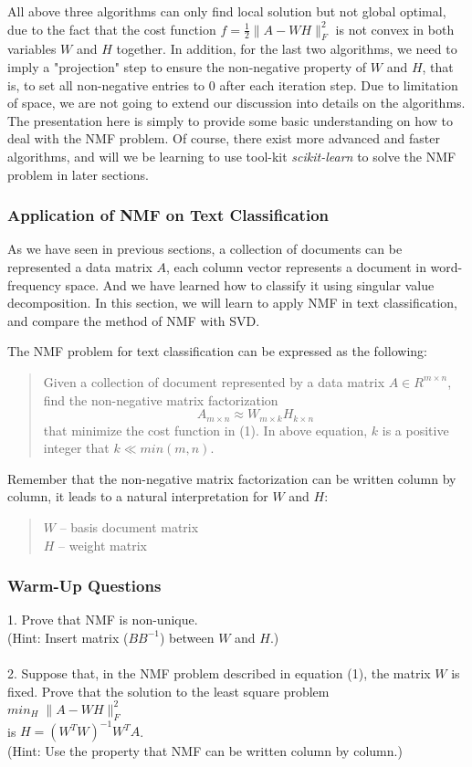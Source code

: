 \documentclass[12pt,letterpaper]{article}
\begin{document}
All above three algorithms can only find local solution but not global optimal, due to the fact that the cost function $f = \frac{1}{2} \|A - WH\|_F^2$ is not convex in both variables $W$ and $H$ together. In addition, for the last two algorithms, we need to imply a "projection" step to ensure the non-negative property of $W$ and $H$, that is, to set all non-negative entries to 0 after each iteration step. Due to limitation of space, we are not going to extend our discussion into details on the algorithms. The presentation here is simply to provide some basic understanding on how to deal with the NMF problem. Of course, there exist more advanced and faster algorithms, and will we be learning to use tool-kit \textit{scikit-learn} to solve the NMF problem in later sections. 
\subsubsection{Application of NMF on Text Classification}
As we have seen in previous sections, a collection of documents can be represented a data matrix $A$, each column vector represents a document in word-frequency space. And we have learned how to classify it using singular value decomposition. In this section, we will learn to apply NMF in text classification, and compare the method of NMF with SVD. 

The NMF problem for text classification can be expressed as the following: 
\begin{quotation}
	\noindent Given a collection of document represented by a data matrix $A \in R^{m\times n}$, find the non-negative matrix factorization
	\begin{equation}
	A_{m\times n} \approx W_{m\times k} H_{k\times n}
	\end{equation}
	that minimize the cost function in (1). In above equation, $k$ is a positive integer that $k \ll min(m, n)$. 
\end{quotation}

Remember that the non-negative matrix factorization can be written column by column, it leads to a natural interpretation for $W$ and $H$:
\begin{quotation}
	\noindent $W$ -- basis document matrix \\
	$H$ -- weight matrix
\end{quotation}
\subsubsection{Warm-Up Questions}
1. Prove that NMF is non-unique. \\
(Hint: Insert matrix ($BB^{-1}$) between $W$ and $H$.) \\
\\
2. Suppose that, in the NMF problem described in equation (1), the matrix $W$ is fixed. Prove that the solution to the least square problem\\ 
\indent $min_{H} \; \| A - WH \|_F^2 $ \\ is $H = (W^TW)^{-1}W^TA$. \\
(Hint: Use the property that NMF can be written column by column.) 
\end{document}
